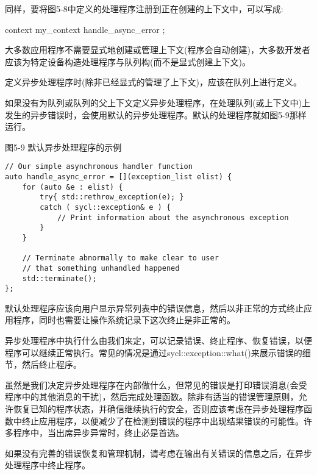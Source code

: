 同样，要将图5-8中定义的处理程序注册到正在创建的上下文中，可以写成:\par

context my\_context{ handle\_async\_error };\par

大多数应用程序不需要显式地创建或管理上下文(程序会自动创建)，大多数开发者应该为特定设备构造处理程序与队列构(而不是显式创建上下文)。\par

\begin{tcolorbox}[colback=red!5!white,colframe=red!75!black]
定义异步处理程序时(除非已经显式的管理了上下文)，应该在队列上进行定义。
\end{tcolorbox}

如果没有为队列或队列的父上下文定义异步处理程序，在处理队列(或上下文中)上发生的异步错误时，会使用默认的异步处理程序。默认的处理程序就如图5-9那样运行。\par

\hspace*{\fill} \par %
图5-9 默认异步处理程序的示例
\begin{lstlisting}[caption={}]
// Our simple asynchronous handler function
auto handle_async_error = [](exception_list elist) {
	for (auto &e : elist) {
		try{ std::rethrow_exception(e); }
		catch ( sycl::exception& e ) {
			// Print information about the asynchronous exception
		}
	}

	// Terminate abnormally to make clear to user
	// that something unhandled happened
	std::terminate();
};
\end{lstlisting}

默认处理程序应该向用户显示异常列表中的错误信息，然后以非正常的方式终止应用程序，同时也需要让操作系统记录下这次终止是非正常的。\par

异步处理程序中执行什么由我们来定，可以记录错误、终止程序、恢复错误，以便程序可以继续正常执行。常见的情况是通过sycl::exception::what()来展示错误的细节，然后终止程序。\par

虽然是我们决定异步处理程序在内部做什么，但常见的错误是打印错误消息(会受程序中的其他消息的干扰)，然后完成处理函数。除非有适当的错误管理原则，允许恢复已知的程序状态，并确信继续执行的安全，否则应该考虑在异步处理程序函数中终止应用程序，以便减少了在检测到错误的程序中出现结果错误的可能性。许多程序中，当出席异步异常时，终止必是首选。\par

\begin{tcolorbox}[colback=red!5!white,colframe=red!75!black]
如果没有完善的错误恢复和管理机制，请考虑在输出有关错误的信息之后，在异步处理程序中终止程序。
\end{tcolorbox}

